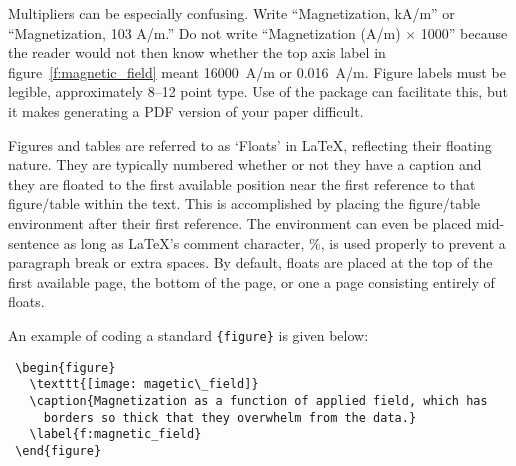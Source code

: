 Multipliers can be especially confusing.
Write ``Magnetization, kA/m'' or ``Magnetization, 103 A/m.''
Do not write ``Magnetization (A/m) $\times$ 1000'' because the reader
would not then know whether the top axis label in
figure~\ref{f:magnetic_field} meant 16000~A/m or 0.016~A/m.
Figure labels must be legible, approximately 8--12 point type.
Use of the  package can facilitate this, but it makes
generating a PDF version of your paper difficult.

Figures and tables are referred to as `Floats' in \LaTeX, reflecting
their floating nature.
They are typically numbered whether or not they have a caption and they
are floated to the first available position near the first reference to
that figure/table within the text.
This is accomplished by placing the figure/table environment after
their first reference.
The environment can even be placed mid-sentence as long as \LaTeX's
comment character, \%, is used properly to prevent a paragraph break or
extra spaces.
By default, floats are placed at the top of the first available page,
the bottom of the page, or one a page consisting entirely of floats.

An example of coding a standard \verb|{figure}| is given below:
\begin{Verbatim}
 \begin{figure}
   \texttt{[image: magetic\_field]}
   \caption{Magnetization as a function of applied field, which has
     borders so thick that they overwhelm from the data.}
   \label{f:magnetic_field}
 \end{figure}
\end{Verbatim}


